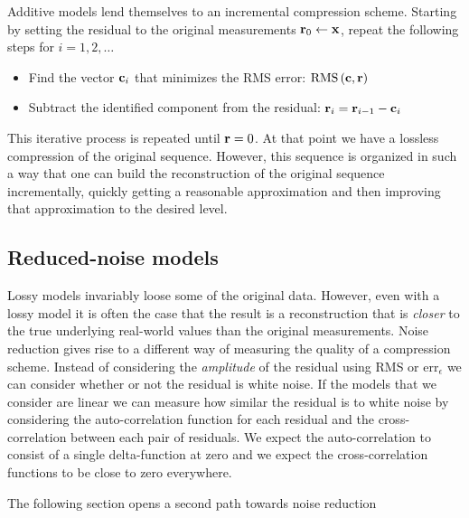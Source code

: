 Additive models lend themselves to an incremental compression
scheme. Starting by setting the residual to the original
measurements $\mathbf{r}_0 \leftarrow \mathbf{x}$, repeat the following steps for
$i=1,2,\ldots$
\begin{itemize}
\item Find the vector $\mathbf{c}_i$ that minimizes the RMS error: 
$\mbox{RMS}\left(\mathbf{c},\mathbf{r} \right)$
\item Subtract the identified component from the residual: $\mathbf{r}_i =
  \mathbf{r}_{i-1}-\mathbf{c}_i$
\end{itemize}
This iterative process is repeated until $\mathbf{r}=0$. At that point we
have a lossless compression of the original sequence. However, this
sequence is organized in such a way that one can build the
reconstruction of the original sequence incrementally, quickly getting
a reasonable approximation and then improving that approximation to
the desired level. 

\subsection{Reduced-noise models}
\label{sec:reduced-noise}

Lossy models invariably loose some of the original
data. However, even with a lossy model it is often the case that the result is a
reconstruction that is {\em closer} to the true underlying real-world
values than the original measurements. 
Noise reduction gives rise to a different way of measuring
the quality of a compression scheme. Instead of considering the {\em
amplitude} of the residual using RMS or $\mbox{err}_{\epsilon}$ we
can consider whether or not the residual is white noise. If the models
that we consider are linear we can measure how similar the residual is
to white noise by considering the auto-correlation function for each
residual and the cross-correlation between each pair of residuals. We
expect the auto-correlation to consist of a single delta-function at
zero and we expect the cross-correlation functions to be close to zero
everywhere.

The following section opens a second path towards noise reduction

\iffalse
This is possible when the model used for compression captures some
inherent regularity in the data. Consider a temperature guage in a
room that is taking a measurement ten times per second. Suppose also
that each measurement is the sum of the true temperature and gaussian
noise with a standard deviation of one degree.  It is clear that
replacing blocks of 10 consecutive measurements by their average is
lossy in terms of the original signal. However, at the same time, the
averaged sequence is closer to the true measurements. This noise
reduction relies of the assumption that room temperature rarely
changes significantly within a tenth of a second. Therefor any rapid
variations in the measured temperature is likely to be an artifact of
the sensor rather than anything real.
\fi



